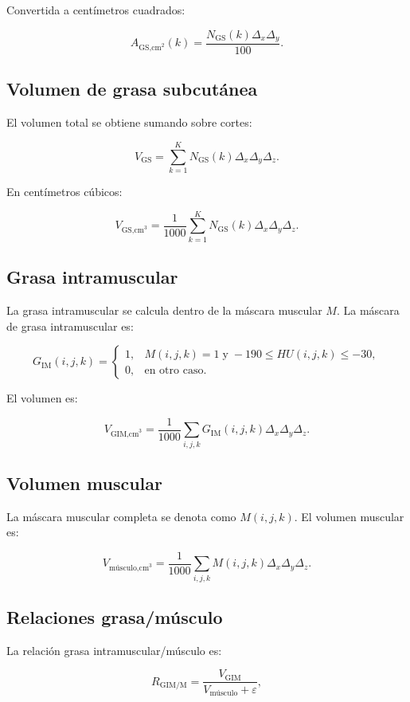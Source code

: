 \documentclass[12pt,a4paper]{article}
\begin{document}
Convertida a centímetros cuadrados:

\[
A_{\text{GS,cm}^2}(k)
=
\frac{N_{\text{GS}}(k)\Delta_x\Delta_y}{100}.
\]

\subsection{Volumen de grasa subcutánea}

El volumen total se obtiene sumando sobre cortes:

\[
V_{\text{GS}}
=
\sum_{k=1}^{K}
N_{\text{GS}}(k)
\Delta_x\Delta_y\Delta_z.
\]

En centímetros cúbicos:

\[
V_{\text{GS,cm}^3}
=
\frac{1}{1000}
\sum_{k=1}^{K}
N_{\text{GS}}(k)
\Delta_x\Delta_y\Delta_z.
\]

\subsection{Grasa intramuscular}

La grasa intramuscular se calcula dentro de la máscara muscular \(M\). La máscara de grasa intramuscular es:

\[
G_{\text{IM}}(i,j,k)=
\begin{cases}
1, & M(i,j,k)=1 \;\text{y}\; -190\leq HU(i,j,k)\leq -30,\\
0, & \text{en otro caso}.
\end{cases}
\]

El volumen es:

\[
V_{\text{GIM,cm}^3}
=
\frac{1}{1000}
\sum_{i,j,k}
G_{\text{IM}}(i,j,k)
\Delta_x\Delta_y\Delta_z.
\]

\subsection{Volumen muscular}

La máscara muscular completa se denota como \(M(i,j,k)\). El volumen muscular es:

\[
V_{\text{músculo,cm}^3}
=
\frac{1}{1000}
\sum_{i,j,k}
M(i,j,k)
\Delta_x\Delta_y\Delta_z.
\]

\subsection{Relaciones grasa/músculo}

La relación grasa intramuscular/músculo es:

\[
R_{\text{GIM/M}}
=
\frac{V_{\text{GIM}}}{V_{\text{músculo}}+\varepsilon},
\]
\end{document}
